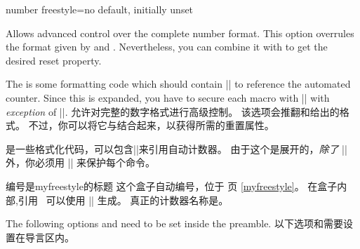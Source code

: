 \begin{newTcbKey}{number freestyle}{=}{no default, initially unset}
\begin{stripedbox}
Allows advanced control over the complete number format.%
This option overrules the format given by  and .
Nevertheless, you can combine it with  to get the desired reset property.\par
The  is some formatting code which should contain |\tcbcounter| to reference the automated counter.
Since this  is expanded, you have to secure each macro with |\noexpand| with \emph{exception} of |\tcbcounter|.
\tcblower
允许对完整的数字格式进行高级控制。%
该选项会推翻和给出的格式。
不过，你可以将它与结合起来，以获得所需的重置属性。\par
{}是一些格式化代码，可以包含|\tcbcounter|来引用自动计数器。
由于这个是展开的，\emph{除了} |\tcbcounter| 外，你必须用 |\noexpand| 来保护每个命令。
\end{stripedbox}


\begin{dispExample}
\begin{phbox}[label={myfreestyle}]{编号是myfreestyle的标题}
这个盒子自动编号，位于 \pageref{myfreestyle} 页 \ref{myfreestyle}。%
在盒子内部,引用 \thetcbcounter\ 可以使用 |\thetcbcounter| 生成。%
真正的计数器名称是\texttt{\tcbcounter}。
\end{phbox}
\end{dispExample}
\end{newTcbKey}

\begin{marker}
\begin{stripedbox}[blank]
The following options  and 
need to be set inside the preamble.
\tcblower
以下选项和需要设置在导言区内。
\end{stripedbox}
\end{marker}

